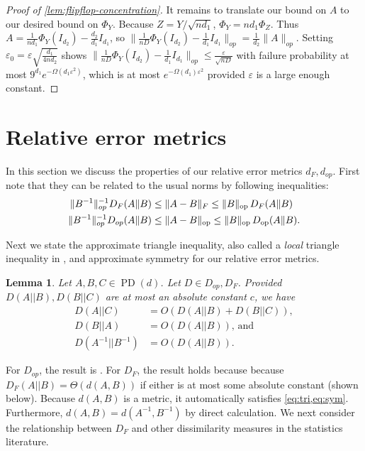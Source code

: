 \documentclass[aos]{imsart}
\newtheorem{lemma}[theorem]{Lemma}
\theoremstyle{definition}
\numberwithin{equation}{section}
\DeclareMathOperator{\op}{op}
\DeclareMathOperator{\PD}{PD}
\DeclarePairedDelimiter{\norm}{\lVert}{\rVert}
\newcommand{\eps}{\varepsilon}
\begin{document}
\begin{appendix}
\begin{proof}[Proof of \cref{lem:flipflop-concentration}]
It remains to translate our bound on $A$ to our desired bound on $\Phi_Y$. Because $Z = Y/\sqrt{nd_1}$, $\Phi_Y = n d_1 \Phi_Z$. Thus $A = \frac{1}{nd_1}\Phi_Y(I_{d_2}) - \frac{d_2}{d_1} I_{d_1}$, so $\|\frac{1}{nD}\Phi_Y(I_{d_2}) - \frac{1}{d_1} I_{d_1}\|_{op} = \frac{1}{d_2} \|A\|_{op}$. Setting $\eps_0 = \eps \sqrt{\frac{d_1}{4n d_2}}$ shows $\|\frac{1}{nD}\Phi_Y(I_{d_2}) - \frac{1}{d_1} I_{d_1}\|_{op} \leq \frac{\eps}{\sqrt{n D}}$ with failure probability at most $9^{d_1} e^{- \Omega(d_1 \eps^2)}$, which is at most $e^{ - \Omega(d_1) \eps^2}$ provided $\eps$ is a large enough constant.\end{proof}


\section{Relative error metrics}\label{sec:rel-error}

In this section we discuss the properties of our relative error metrics $d_F, d_{op}$. First note that they can be related to the usual norms by following inequalities:
\begin{align*}\|B^{-1}\|_{op}^{-1}D_F(A\Vert B)&\leq \norm{A - B}_F \leq \norm{B}_{\op} \, D_F(A\Vert B)\\
\|B^{-1}\|_{op}^{-1} D_{op}(A\Vert B) &\leq \norm{A  - B}_{\op} \leq \norm{B}_{\op} \, D_{\op}(A \Vert B).
\end{align*}






Next we state the approximate triangle inequality, also called a \emph{local} triangle inequality in \cite{yang1999information}, and approximate symmetry for our relative error metrics.
\begin{lemma}\label{lem:triangle-ineq}
Let $A, B, C \in \PD(d)$. Let $D \in D_{op}, D_F$. Provided $D(A||B), D(B||C)$ are at most an absolute constant $c$, we have
\begin{align}D(A||C) &= O(D(A||B) + D(B||C)),\label{eq:tri}\\
D(B||A) &= O(D(A||B))\label{eq:sym} \text{, and }\\
D(A^{-1}||B^{-1}) &= O(D(A||B)).
\end{align}
\end{lemma}
For $D_{op}$, the result is \cite[Lemma C.1]{FM20}. For $D_F$, the result holds because because $D_F(A|| B) = \Theta(d(A, B))$ if either is at most some absolute constant (shown below). Because $d(A, B)$ is a metric, it automatically satisfies \cref{eq:tri,eq:sym}. Furthermore, $d(A,B) = d(A^{-1}, B^{-1})$ by direct calculation. We next consider the relationship between $D_F$ and other dissimilarity measures in the statistics literature.


\end{appendix}
\end{document}
